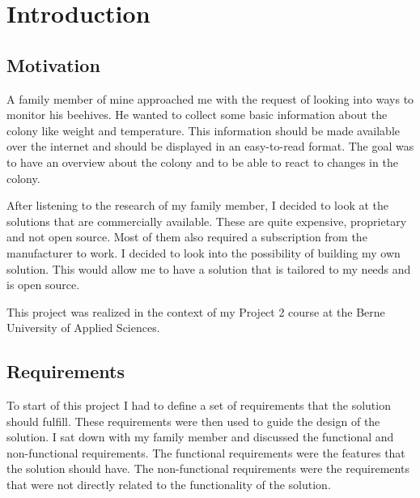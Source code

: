 \chapter{Introduction}

\section{Motivation}
A family member of mine approached me with the request of looking into ways to monitor his beehives. He wanted to collect some basic information about the colony like weight and temperature. This information should be made available over the internet and should be displayed in an easy-to-read format. The goal was to have an overview about the colony and to be able to react to changes in the colony.

After listening to the research of my family member, I decided to look at the solutions that are commercially available. These are quite expensive, proprietary and not open source. Most of them also required a subscription from the manufacturer to work. I decided to look into the possibility of building my own solution. This would allow me to have a solution that is tailored to my needs and is open source.

This project was realized in the context of my Project 2 course at the Berne University of Applied Sciences.

\pagebreak
\section{Requirements}
To start of this project I had to define a set of requirements that the solution should fulfill. These requirements were then used to guide the design of the solution. I sat down with my family member and discussed the functional and non-functional requirements. The functional requirements were the features that the solution should have. The non-functional requirements were the requirements that were not directly related to the functionality of the solution.

